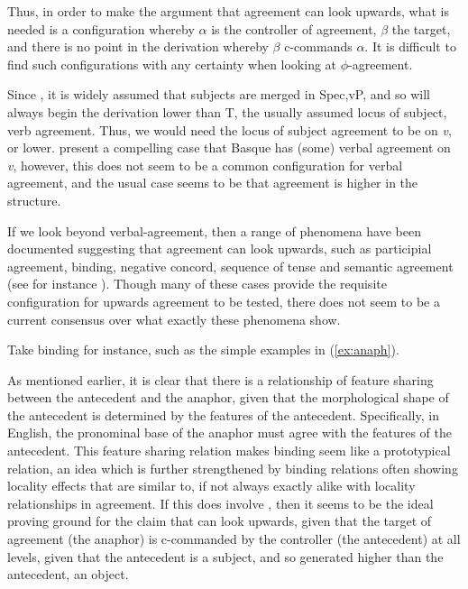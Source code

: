 \documentclass[output=paper
,modfonts
,nonflat]{langsci/langscibook}
\begin{document}
Thus, in order to make the argument that agreement can look upwards, what is needed is a configuration whereby $\alpha$ is the controller of agreement, $\beta$ the target, and there is no point in the derivation whereby $\beta$ c-commands $\alpha$.
It is difficult to find such configurations with any certainty when looking at $\phi$-agreement.


Since \citet{koopmansportiche1991}, it is widely assumed that subjects are merged in Spec,vP, and so will always begin the derivation lower than T, the usually assumed locus of subject, verb agreement.
Thus, we would need the locus of subject agreement to be on \emph{v}, or lower.
\citet{bejarrezac2009} present a compelling case that Basque has (some) verbal agreement on \textit{v}, however, this does not seem to be a common configuration for verbal agreement, and the usual case seems to be that agreement is higher in the structure.

If we look beyond verbal-agreement, then a range of phenomena have been documented suggesting that agreement can look upwards, such as participial agreement, binding, negative concord, sequence of tense and semantic agreement (see for instance \citealp{Wurmbrand2012,Zeijlstra2012,smithdiss}).
Though many of these cases provide the requisite configuration for upwards agreement to be tested, there does not seem to be a current consensus over what exactly these phenomena show.

Take binding for instance, such as the simple examples in (\ref{ex:anaph}).
\begin{exe}
	\ex \label{ex:anaph}
	\begin{xlist}
	\end{xlist}
\end{exe}
As mentioned earlier, it is clear that there is a relationship of feature sharing between the antecedent and the anaphor, given that the morphological shape of the antecedent is determined by the features of the antecedent.
Specifically, in English, the pronominal base of the anaphor must agree with the features of the antecedent.
This feature sharing relation makes binding seem like a prototypical {\agr} relation, an idea which is further strengthened by binding relations often showing locality effects that are similar to, if not always exactly alike with locality relationships in agreement.
If this does involve \agr, then it seems to be the ideal proving ground for the claim that {\agr} can look upwards, given that the target of agreement (the anaphor) is c-commanded by the controller (the antecedent) at all levels, given that the antecedent is a subject, and so  generated higher than the antecedent, an object.
\end{document}
